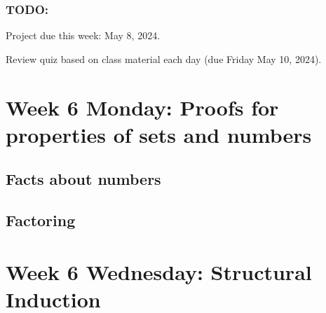 \subsubsection*{TODO:}
\begin{list}
   {\itemsep2pt}
   \item Project due this week: May 8, 2024. 
   \item Review quiz based on class material each day (due Friday May 10, 2024).
\end{list}

\newpage

\section*{Week 6 Monday: Proofs for properties of sets and numbers}



\subsection*{Facts about numbers}


\newpage
\subsection*{Factoring}







\newpage


\section*{Week 6 Wednesday: Structural Induction}


